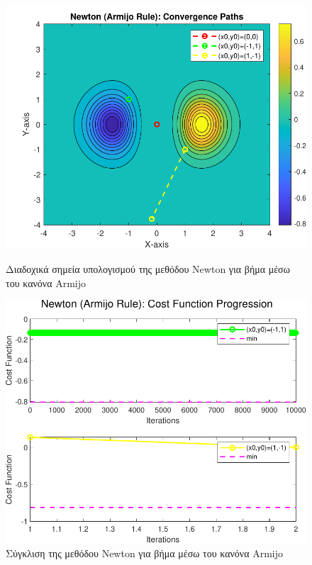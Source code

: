 \documentclass[a4paper,12pt]{article}
\begin{document}
\begin{figure}[h]
    \centering
    \begin{minipage}{0.47\textwidth}
        \centering
        \includegraphics[width=1\linewidth]{plot/newton_armijo_rule_contour.pdf}
        \caption{\small Διαδοχικά σημεία υπολογισμού της μεθόδου  Newton  για βήμα μέσω του κανόνα  Armijo }
        \label{fig:newton_armijo_rule_contour}
    \end{minipage} \hfill
    \begin{minipage}{0.47\textwidth}
        \centering
        \includegraphics[width=1\linewidth]{plot/newton_armijo_rule_costs.pdf}
        \caption{\small Σύγκλιση της μεθόδου  Newton  για βήμα μέσω του κανόνα  Armijo }
        \label{fig:newton_armijo_rule_costs}
    \end{minipage}
\end{figure}
\end{document}
